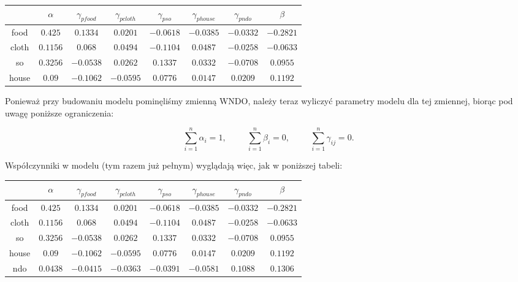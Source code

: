 \documentclass[11pt,a4paper]{report}
\begin{document}
\begin{center}
\begin{tabular}{|c|c|c|c|c|c|c|c|}
\hline
& $\alpha$  & $\gamma_{pfood}$  & $\gamma_{pcloth}$  & $\gamma_{pso}$  & $\gamma_{phouse}$  & $\gamma_{pndo}$  & $\beta$  \\  \hline
food  & $ 0.425 $ & $ 0.1334 $ & $ 0.0201 $ & $ -0.0618 $ & $ -0.0385 $ & $ -0.0332 $ & $ -0.2821 $ \\  \hline 
cloth  & $ 0.1156 $ & $ 0.068 $ & $ 0.0494 $ & $ -0.1104 $ & $ 0.0487 $ & $ -0.0258 $ & $ -0.0633 $ \\  \hline 
so  & $ 0.3256 $ & $ -0.0538 $ & $ 0.0262 $ & $ 0.1337 $ & $ 0.0332 $ & $ -0.0708 $ & $ 0.0955 $ \\  \hline 
house  & $ 0.09 $ & $ -0.1062 $ & $ -0.0595 $ & $ 0.0776 $ & $ 0.0147 $ & $ 0.0209 $ & $ 0.1192 $ \\  \hline 
\end{tabular}
\end{center}

Ponieważ przy budowaniu modelu pominęliśmy zmienną WNDO, należy teraz wyliczyć parametry modelu dla tej zmiennej, biorąc pod uwagę poniższe ograniczenia:

$$
\sum_{i=1}^n \alpha_i=1, \hspace{1cm} \sum_{i=1}^n \beta_i=0,  \hspace{1cm} \sum_{i=1}^n \gamma_{ij}=0.
$$

Współczynniki w modelu (tym razem już pełnym) wyglądają więc, jak w poniższej tabeli:

\bigskip

\begin{center}
\begin{tabular}{|c|c|c|c|c|c|c|c|}
\hline
& $\alpha$  & $\gamma_{pfood}$  & $\gamma_{pcloth}$  & $\gamma_{pso}$  & $\gamma_{phouse}$  & $\gamma_{pndo}$  & $\beta$  \\  \hline
food  & $ 0.425 $ & $ 0.1334 $ & $ 0.0201 $ & $ -0.0618 $ & $ -0.0385 $ & $ -0.0332 $ & $ -0.2821 $ \\  \hline 
cloth  & $ 0.1156 $ & $ 0.068 $ & $ 0.0494 $ & $ -0.1104 $ & $ 0.0487 $ & $ -0.0258 $ & $ -0.0633 $ \\  \hline 
so  & $ 0.3256 $ & $ -0.0538 $ & $ 0.0262 $ & $ 0.1337 $ & $ 0.0332 $ & $ -0.0708 $ & $ 0.0955 $ \\  \hline 
house  & $ 0.09 $ & $ -0.1062 $ & $ -0.0595 $ & $ 0.0776 $ & $ 0.0147 $ & $ 0.0209 $ & $ 0.1192 $ \\  \hline 
ndo  & $ 0.0438 $ & $ -0.0415 $ & $ -0.0363 $ & $ -0.0391 $ & $ -0.0581 $ & $ 0.1088 $ & $ 0.1306 $ \\  \hline 
\end{tabular}
\end{center}
\end{document}
